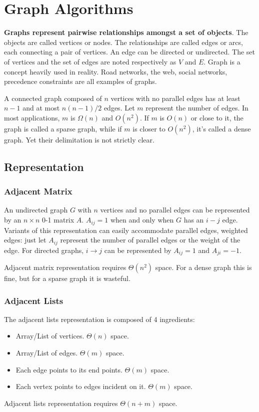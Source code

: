 \ifx\PREAMBLE\undefined


\fi
\chapter{Graph Algorithms}
\textbf{Graphs represent pairwise relationships amongst a set of objects}. The objects are called vertices or nodes. The relationships are called edges or arcs, each connecting a pair of vertices. An edge can be directed or undirected. The set of vertices and the set of edges are noted respectively as $V$ and $E$. Graph is a concept heavily used in reality. Road networks, the web, social networks, precedence constraints are all examples of graphs.

A connected graph composed of $n$ vertices with no parallel edges has at least $n-1$ and at most $n(n-1)/2$ edges. Let $m$ represent the number of edges. In most applications, $m$ is $\Omega(n)$ and $O(n^2)$. If $m$ is $O(n)$ or close to it, the graph is called a sparse graph, while if $m$ is closer to $O(n^2)$, it's called a dense graph. Yet their delimitation is not strictly clear. 
\section{Representation}
\subsection{Adjacent Matrix}
An undirected graph $G$ with $n$ vertices and no parallel edges can be represented by an $n\times n$ 0-1 matrix $A$. $A_{ij}=1$ when and only when $G$ has an $i-j$ edge. Variants of this representation can easily accommodate parallel edges, weighted edges: just let $A_{ij}$ represent the number of parallel edges or the weight of the edge. For directed graphs, $i\rightarrow j$ can be represented by $A_{ij}=1$ and $A_{ji}=-1$.

Adjacent matrix representation requires $\Theta(n^2)$ space. For a dense graph this is fine, but for a sparse graph it is wasteful. 
\subsection{Adjacent Lists}
The adjacent lists representation is composed of 4 ingredients:
\begin{itemize}
\item Array/List of vertices. $\Theta(n)$ space.
\item Array/List of edges. $\Theta(m)$ space.
\item Each edge points to its end points. $\Theta(m)$ space.
\item Each vertex points to edges incident on it. $\Theta(m)$ space.
\end{itemize}
Adjacent lists representation requires $\Theta(n+m)$ space. 

